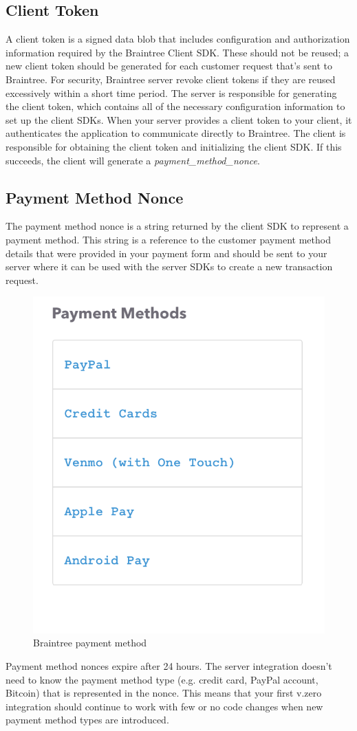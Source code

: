 \subsection{Client Token}
A client token is a signed data blob that includes configuration and authorization information required by the Braintree Client SDK. These should not be reused; a new client token should be generated for each customer request that's sent to Braintree. For security, Braintree server revoke client tokens if they are reused excessively within a short time period.
The server is responsible for generating the client token, which contains all of the necessary configuration information to set up the client SDKs. When your server provides a client token to your client, it authenticates the application to communicate directly to Braintree.
The client is responsible for obtaining the client token and initializing the client SDK. If this succeeds, the client will generate a \emph{payment\_method\_nonce}.
\subsection{Payment Method Nonce}
The payment method nonce is a string returned by the client SDK to represent a payment method. This string is a reference to the customer payment method details that were provided in your payment form and should be sent to your server where it can be used with the server SDKs to create a new transaction request.
\begin{figure}[htb]
  \centering
  \includegraphics[width=0.4\linewidth]{images/chapter4/braintree-payment-method.png}\hfill
  \caption[Braintree payment method]{Braintree payment method}
  \label{fig:braintree_payment_method}
\end{figure}
Payment method nonces expire after 24 hours.
The server integration doesn't need to know the payment method type (e.g. credit card, PayPal account, Bitcoin) that is represented in the nonce. This means that your first v.zero integration should continue to work with few or no code changes when new payment method types are introduced.
